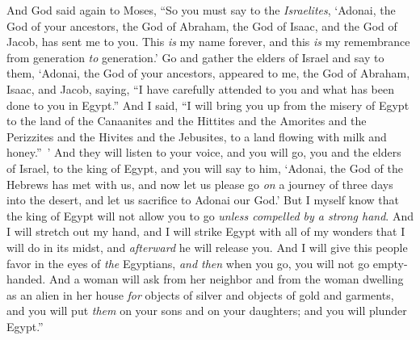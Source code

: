 \begin{biblechapter}
\verse And God said again to Moses, “So you must say to the \textit{Israelites}, ‘Adonai, the God of your ancestors, the God of Abraham, the God of Isaac, and the God of Jacob, has sent me to you. This \textit{is} my name forever, and this \textit{is} my remembrance from generation \textit{to} generation.’
\verse Go and gather the elders of Israel and say to them, ‘Adonai, the God of your ancestors, appeared to me, the God of Abraham, Isaac, and Jacob, saying, “I have carefully attended to you and what has been done to you in Egypt.”
\verse And I said, “I will bring you up from the misery of Egypt to the land of the Canaanites and the Hittites and the Amorites and the Perizzites and the Hivites and the Jebusites, to a land flowing with milk and honey.” ’
\verse And they will listen to your voice, and you will go, you and the elders of Israel, to the king of Egypt, and you will say to him, ‘Adonai, the God of the Hebrews has met with us, and now let us please go \textit{on} a journey of three days into the desert, and let us sacrifice to Adonai our God.’
\verse But I myself know that the king of Egypt will not allow you to go \textit{unless compelled by a strong hand}.
\verse And I will stretch out my hand, and I will strike Egypt with all of my wonders that I will do in its midst, and \textit{afterward} he will release you.
\verse And I will give this people favor in the eyes of \textit{the} Egyptians, \textit{and then} when you go, you will not go empty-handed.
\verse And a woman will ask from her neighbor and from the woman dwelling as an alien in her house \textit{for} objects of silver and objects of gold and garments, and you will put \textit{them} on your sons and on your daughters; and you will plunder Egypt.”
\end{biblechapter}

